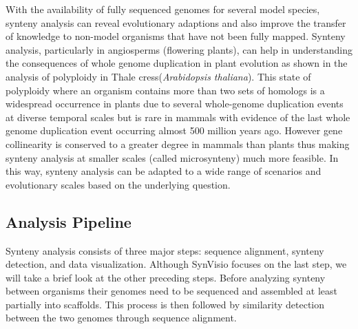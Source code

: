 With the availability of fully sequenced genomes for several model species, synteny analysis can reveal evolutionary adaptions and also improve the transfer of knowledge to non-model organisms that have not been fully mapped\cite{zhao2019network}. Synteny analysis, particularly in angiosperms (flowering plants), can help in understanding the consequences of whole genome duplication in plant evolution\cite{adams2005polyploidy} as shown in the analysis of polyploidy in Thale cress(\textit{Arabidopsis thaliana})\cite{seoighe2003turning}. This state of polyploidy where an organism contains more than two sets of homologs is a widespread occurrence in plants  due to several whole-genome duplication events at diverse temporal scales but is rare in mammals with evidence of the last whole genome duplication event occurring almost 500 million years ago\cite{adams2005polyploidy,panopoulou2005timing}. However gene collinearity is conserved to a greater degree in mammals than plants thus making synteny analysis at smaller scales (called microsynteny) much more feasible\cite{zhao2019network}. In this way, synteny analysis can be adapted to a wide range of scenarios and evolutionary scales based on the underlying question.

\subsection{Analysis Pipeline}

Synteny analysis consists of three major steps: sequence alignment, synteny detection, and data visualization. Although SynVisio focuses on the last step, we will take a brief look at the other preceding steps. Before analyzing synteny between organisms their genomes need to be sequenced and assembled at least partially into scaffolds. This process is then followed by similarity detection between the two genomes through sequence alignment.



